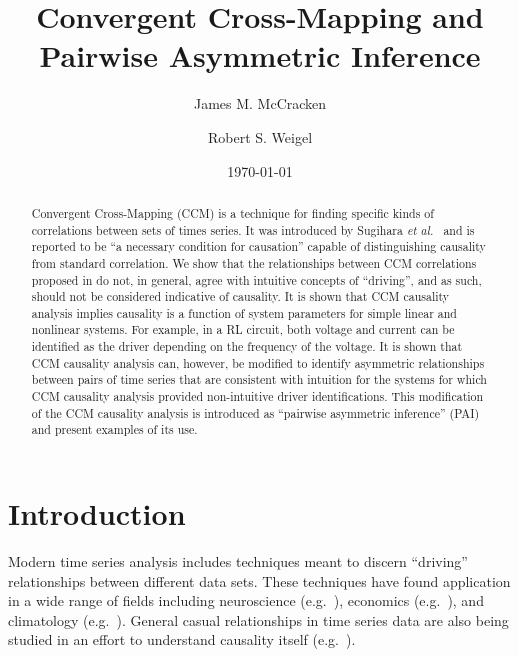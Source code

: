 \documentclass[twocolumn,aps,pre,groupedaddress]{revtex4-1}
\begin{document}
\title{Convergent Cross-Mapping and Pairwise Asymmetric Inference}
\author{James M. McCracken}
\author{Robert S. Weigel}
\date{\today}

\begin{abstract}
Convergent Cross-Mapping (CCM) is a technique for finding specific kinds of correlations between sets of times series.  It was introduced by Sugihara {\em et al.\ }\cite{Sugihara2012} and is reported to be ``a necessary condition for causation'' capable of distinguishing causality from standard correlation.  We show that the relationships between CCM correlations proposed in \cite{Sugihara2012} do not, in general, agree with intuitive concepts of ``driving'', and as such, should not be considered indicative of causality.  It is shown that CCM causality analysis implies causality is a function of system parameters for simple linear and nonlinear systems.  For example, in a RL circuit, both voltage and current can be identified as the driver depending on the frequency of the voltage.  It is shown that CCM causality analysis can, however, be modified to identify asymmetric relationships between pairs of time series that are consistent with intuition for the systems for which CCM causality analysis provided non-intuitive driver identifications.  This modification of the CCM causality analysis is introduced as ``pairwise asymmetric inference'' (PAI) and present examples of its use.  
\end{abstract}

\pacs{}
\maketitle

\section{Introduction}
Modern time series analysis includes techniques meant to discern ``driving'' relationships between different data sets.  These techniques have found application in a wide range of fields including neuroscience (e.g.\ \cite{Kaminski2001}), economics (e.g.\ \cite{dufour1998,dufour2006}), and climatology (e.g.\ \cite{mosedale2006}).  General casual relationships in time series data are also being studied in an effort to understand causality itself (e.g.\ \cite{eichler2012}).  
\end{document}

